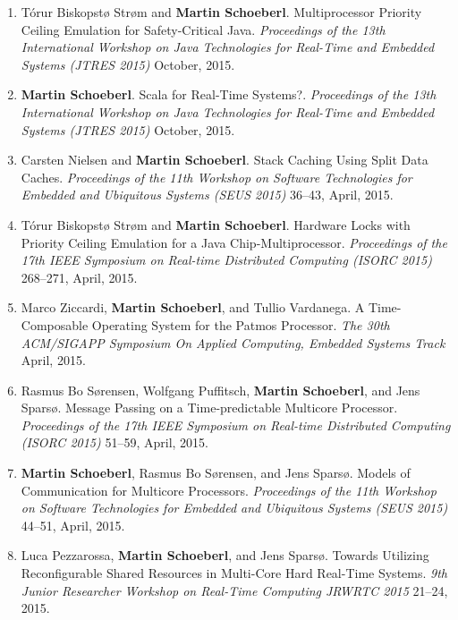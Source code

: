 \begin{enumerate}
\item T{\'o}rur Biskopst{\o} Str{\o}m and {\bf Martin Schoeberl}.
 Multiprocessor Priority Ceiling Emulation for Safety-Critical Java.
 \emph{Proceedings of the 13th International Workshop on Java Technologies for Real-Time and Embedded Systems (JTRES 2015)} October, 2015.

\item {\bf Martin Schoeberl}.
 Scala for Real-Time Systems?.
 \emph{Proceedings of the 13th International Workshop on Java Technologies for Real-Time and Embedded Systems (JTRES 2015)} October, 2015.

\item Carsten Nielsen and {\bf Martin Schoeberl}.
 Stack Caching Using Split Data Caches.
 \emph{Proceedings of the 11th Workshop on Software Technologies for Embedded and Ubiquitous Systems (SEUS 2015)} 36--43, April, 2015.

\item T{\'o}rur Biskopst{\o} Str{\o}m and {\bf Martin Schoeberl}.
 Hardware Locks with Priority Ceiling Emulation for a Java Chip-Multiprocessor.
 \emph{Proceedings of the 17th IEEE Symposium on Real-time Distributed Computing (ISORC 2015)} 268--271, April, 2015.

\item Marco Ziccardi, {\bf Martin Schoeberl}, and Tullio Vardanega.
 A Time-Composable Operating System for the Patmos Processor.
 \emph{The 30th ACM/SIGAPP Symposium On Applied Computing, Embedded Systems Track} April, 2015.

\item Rasmus Bo S{\o}rensen, Wolfgang Puffitsch, {\bf Martin Schoeberl}, and Jens Spars{\o}.
 Message Passing on a Time-predictable Multicore Processor.
 \emph{Proceedings of the 17th IEEE Symposium on Real-time Distributed Computing (ISORC 2015)} 51--59, April, 2015.

\item {\bf Martin Schoeberl}, Rasmus Bo S{\o}rensen, and Jens Spars{\o}.
 Models of Communication for Multicore Processors.
 \emph{Proceedings of the 11th Workshop on Software Technologies for Embedded and Ubiquitous Systems (SEUS 2015)} 44--51, April, 2015.

\item Luca Pezzarossa, {\bf Martin Schoeberl}, and Jens Spars{\o}.
 Towards Utilizing Reconfigurable Shared Resources in Multi-Core Hard Real-Time Systems.
 \emph{9th Junior Researcher Workshop on Real-Time Computing JRWRTC 2015} 21--24, 2015.



\end{enumerate}
